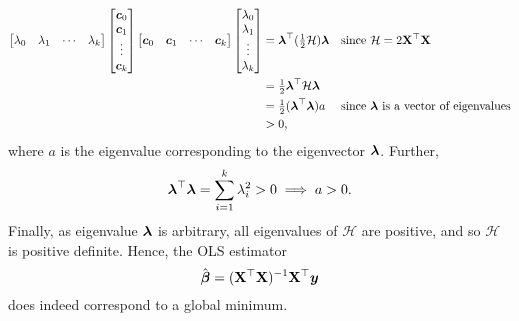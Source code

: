 \begin{align*}
    \begin{bmatrix}
        \lambda_0 & \lambda_1 & \cdots & \lambda_k
    \end{bmatrix}\begin{bmatrix}
                     {\boldsymbol c}_0 \\
                     {\boldsymbol c}_1 \\
                     \vdots       \\
                     {\boldsymbol c}_k
                 \end{bmatrix}\begin{bmatrix}
                                  {\boldsymbol c}_0 &
                                  {\boldsymbol c}_1 &
                                  \cdots       &
                                  {\boldsymbol c}_k
                              \end{bmatrix}\begin{bmatrix}
                                               \lambda_0 \\ \lambda_1 \\ \vdots \\ \lambda_k
                                           \end{bmatrix}
     & ={\boldsymbol \lambda}^\top(\tfrac{1}{2}\mathcal{H}){\boldsymbol \lambda} &  & \text{since $ \mathcal{H}=2 \mathbf{X}^\top \mathbf{X} $}    \\
     & =\tfrac{1}{2}{\boldsymbol \lambda}^\top \mathcal{H}{\boldsymbol \lambda}                                                                    \\
     & =\tfrac{1}{2}({\boldsymbol \lambda}^\top {\boldsymbol \lambda})a          &  & \text{since $ {\boldsymbol \lambda} $ is a vector of eigenvalues} \\
     & >0,
\end{align*}
where $ a $ is the eigenvalue corresponding to the eigenvector $ {\boldsymbol \lambda} $.
Further,
\[ {\boldsymbol \lambda}^\top {\boldsymbol \lambda}=\sum_{i=1}^{k}\lambda_i^2>0\implies a>0. \]
Finally, as eigenvalue $ {\boldsymbol \lambda} $ is arbitrary, all eigenvalues
of $ \mathcal{H} $ are positive, and so $ \mathcal{H} $ is positive definite.
Hence, the OLS estimator
\[ \hat{{\boldsymbol \beta}}=(\mathbf{X}^\top \mathbf{X})^{-1}\mathbf{X}^\top {\boldsymbol y} \]
does indeed correspond to a global minimum.

